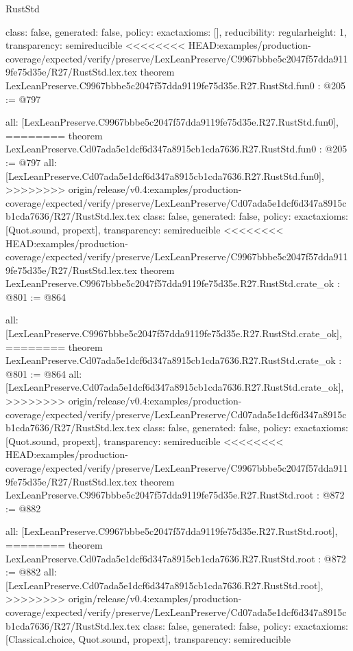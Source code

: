 \begin{lexlean}{RustStd}
\begin{coremodule}
{\begin{coremodule}
{{{  class: false,
  generated: false,
  policy: exact{axioms: []},
  reducibility: regular{height: 1},
  transparency: semireducible
}
<<<<<<<< HEAD:examples/production-coverage/expected/verify/preserve/LexLeanPreserve/C9967bbbe5c2047f57dda9119fe75d35e/R27/RustStd.lex.tex
theorem LexLeanPreserve.C9967bbbe5c2047f57dda9119fe75d35e.R27.RustStd.fun0 : @205 := @797 {
  all: [LexLeanPreserve.C9967bbbe5c2047f57dda9119fe75d35e.R27.RustStd.fun0],
========
theorem LexLeanPreserve.Cd07ada5e1dcf6d347a8915cb1cda7636.R27.RustStd.fun0 : @205 := @797 {
  all: [LexLeanPreserve.Cd07ada5e1dcf6d347a8915cb1cda7636.R27.RustStd.fun0],
>>>>>>>> origin/release/v0.4:examples/production-coverage/expected/verify/preserve/LexLeanPreserve/Cd07ada5e1dcf6d347a8915cb1cda7636/R27/RustStd.lex.tex
  class: false,
  generated: false,
  policy: exact{axioms: [Quot.sound, propext]},
  transparency: semireducible
}
<<<<<<<< HEAD:examples/production-coverage/expected/verify/preserve/LexLeanPreserve/C9967bbbe5c2047f57dda9119fe75d35e/R27/RustStd.lex.tex
theorem LexLeanPreserve.C9967bbbe5c2047f57dda9119fe75d35e.R27.RustStd.crate_ok : @801 := @864 {
  all: [LexLeanPreserve.C9967bbbe5c2047f57dda9119fe75d35e.R27.RustStd.crate_ok],
========
theorem LexLeanPreserve.Cd07ada5e1dcf6d347a8915cb1cda7636.R27.RustStd.crate_ok : @801 := @864 {
  all: [LexLeanPreserve.Cd07ada5e1dcf6d347a8915cb1cda7636.R27.RustStd.crate_ok],
>>>>>>>> origin/release/v0.4:examples/production-coverage/expected/verify/preserve/LexLeanPreserve/Cd07ada5e1dcf6d347a8915cb1cda7636/R27/RustStd.lex.tex
  class: false,
  generated: false,
  policy: exact{axioms: [Quot.sound, propext]},
  transparency: semireducible
}
<<<<<<<< HEAD:examples/production-coverage/expected/verify/preserve/LexLeanPreserve/C9967bbbe5c2047f57dda9119fe75d35e/R27/RustStd.lex.tex
theorem LexLeanPreserve.C9967bbbe5c2047f57dda9119fe75d35e.R27.RustStd.root : @872 := @882 {
  all: [LexLeanPreserve.C9967bbbe5c2047f57dda9119fe75d35e.R27.RustStd.root],
========
theorem LexLeanPreserve.Cd07ada5e1dcf6d347a8915cb1cda7636.R27.RustStd.root : @872 := @882 {
  all: [LexLeanPreserve.Cd07ada5e1dcf6d347a8915cb1cda7636.R27.RustStd.root],
>>>>>>>> origin/release/v0.4:examples/production-coverage/expected/verify/preserve/LexLeanPreserve/Cd07ada5e1dcf6d347a8915cb1cda7636/R27/RustStd.lex.tex
  class: false,
  generated: false,
  policy: exact{axioms: [Classical.choice, Quot.sound, propext]},
  transparency: semireducible
}

}}}}}
\end{coremodule}}
\end{coremodule}
\end{lexlean}
